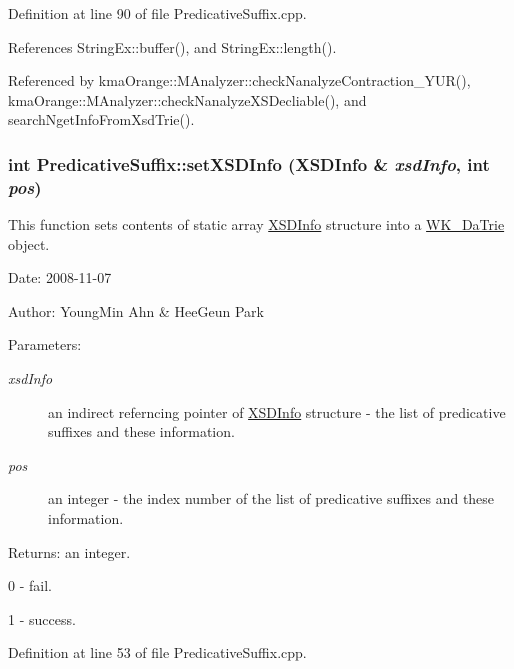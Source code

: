 Definition at line 90 of file PredicativeSuffix.cpp.

References StringEx::buffer(), and StringEx::length().

Referenced by kmaOrange::MAnalyzer::checkNanalyzeContraction\_\-YUR(), kmaOrange::MAnalyzer::checkNanalyzeXSDecliable(), and searchNgetInfoFromXsdTrie().\hypertarget{classkmaOrange_1_1PredicativeSuffix_fda9a2d25687af35ea311de9bc2b5af8}{
\subsubsection[{setXSDInfo}]{\setlength{\rightskip}{0pt plus 5cm}int PredicativeSuffix::setXSDInfo ({\bf XSDInfo} \& {\em xsdInfo}, \/  int {\em pos})}}
\label{classkmaOrange_1_1PredicativeSuffix_fda9a2d25687af35ea311de9bc2b5af8}


This function sets contents of static array \hyperlink{structkmaOrange_1_1XSDInfo}{XSDInfo} structure into a \hyperlink{classkmaOrange_1_1WK__DaTrie}{WK\_\-DaTrie} object. 

\begin{Desc}
\item[Date:]2008-11-07 \end{Desc}
\begin{Desc}
\item[Author:]YoungMin Ahn \& HeeGeun Park \end{Desc}
\begin{Desc}
\item[Parameters:]
\begin{description}
\item[{\em xsdInfo}]an indirect referncing pointer of \hyperlink{structkmaOrange_1_1XSDInfo}{XSDInfo} structure - the list of predicative suffixes and these information. \item[{\em pos}]an integer - the index number of the list of predicative suffixes and these information. \end{description}
\end{Desc}
\begin{Desc}
\item[Returns:]an integer.\par
 0 - fail.\par
 1 - success. \end{Desc}


Definition at line 53 of file PredicativeSuffix.cpp.

